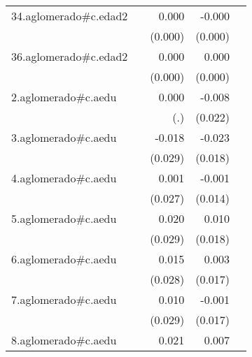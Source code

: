 {\begin{longtable}{l*{4}{D{.}{.}{-1}}}
\addlinespace
34.aglomerado#c.edad2&                     &       0.000         &      -0.000         &                     \\
            &                     &     (0.000)         &     (0.000)         &                     \\
\addlinespace
36.aglomerado#c.edad2&                     &       0.000\sym{*}  &       0.000         &                     \\
            &                     &     (0.000)         &     (0.000)         &                     \\
\addlinespace
2.aglomerado#c.aedu&                     &       0.000         &      -0.008         &                     \\
            &                     &         (.)         &     (0.022)         &                     \\
\addlinespace
3.aglomerado#c.aedu&                     &      -0.018         &      -0.023         &                     \\
            &                     &     (0.029)         &     (0.018)         &                     \\
\addlinespace
4.aglomerado#c.aedu&                     &       0.001         &      -0.001         &                     \\
            &                     &     (0.027)         &     (0.014)         &                     \\
\addlinespace
5.aglomerado#c.aedu&                     &       0.020         &       0.010         &                     \\
            &                     &     (0.029)         &     (0.018)         &                     \\
\addlinespace
6.aglomerado#c.aedu&                     &       0.015         &       0.003         &                     \\
            &                     &     (0.028)         &     (0.017)         &                     \\
\addlinespace
7.aglomerado#c.aedu&                     &       0.010         &      -0.001         &                     \\
            &                     &     (0.029)         &     (0.017)         &                     \\
\addlinespace
8.aglomerado#c.aedu&                     &       0.021         &       0.007         &                     \\

\end{longtable}}
